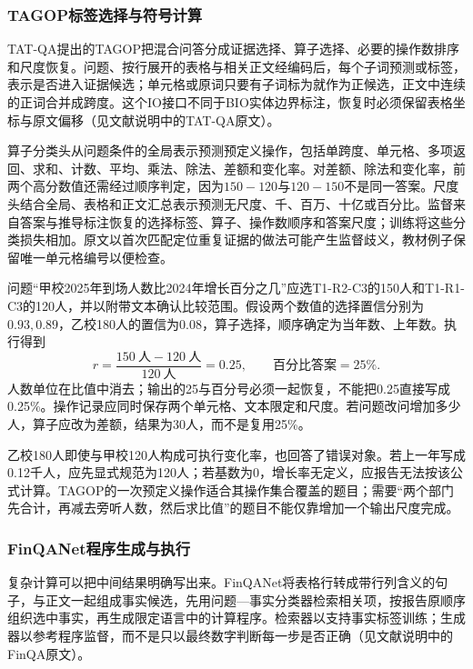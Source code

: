 \subsubsection{TAGOP标签选择与符号计算}
\label{sec:nlp-dialogue-tagop}

TAT-QA提出的TAGOP把混合问答分成证据选择、算子选择、必要的操作数排序和尺度恢复。问题、按行展开的表格与相关正文经编码后，每个子词预测或标签，表示是否进入证据候选；单元格或原词只要有子词标为就作为正候选，正文中连续的正词合并成跨度。这个IO接口不同于BIO实体边界标注，恢复时必须保留表格坐标与原文偏移（见文献说明中的TAT-QA原文）。

算子分类头从问题条件的全局表示预测预定义操作，包括单跨度、单元格、多项返回、求和、计数、平均、乘法、除法、差额和变化率。对差额、除法和变化率，前两个高分数值还需经过顺序判定，因为$150-120$与$120-150$不是同一答案。尺度头结合全局、表格和正文汇总表示预测无尺度、千、百万、十亿或百分比。监督来自答案与推导标注恢复的选择标签、算子、操作数顺序和答案尺度；训练将这些分类损失相加。原文以首次匹配定位重复证据的做法可能产生监督歧义，教材例子保留唯一单元格编号以便检查。

问题“甲校2025年到场人数比2024年增长百分之几”应选T1-R2-C3的150人和T1-R1-C3的120人，并以附带文本确认比较范围。假设两个数值的选择置信分别为$0.93,0.89$，乙校180人的置信为$0.08$，算子选择，顺序确定为当年数、上年数。执行得到
\begin{equation}
 r=\frac{150\ \text{人}-120\ \text{人}}{120\ \text{人}}
   =0.25,\qquad \text{百分比答案}=25\%.
 \label{eq:nlp-dialogue-growth}
\end{equation}
人数单位在比值中消去；输出的25与百分号必须一起恢复，不能把0.25直接写成0.25\%。操作记录应同时保存两个单元格、文本限定和尺度。若问题改问增加多少人，算子应改为差额，结果为30人，而不是复用25\%。

乙校180人即使与甲校120人构成可执行变化率，也回答了错误对象。若上一年写成0.12千人，应先显式规范为120人；若基数为0，增长率无定义，应报告无法按该公式计算。TAGOP的一次预定义操作适合其操作集合覆盖的题目；需要“两个部门先合计，再减去旁听人数，然后求比值”的题目不能仅靠增加一个输出尺度完成。

\subsubsection{FinQANet程序生成与执行}
\label{sec:nlp-dialogue-finqa}

复杂计算可以把中间结果明确写出来。FinQANet将表格行转成带行列含义的句子，与正文一起组成事实候选，先用问题—事实分类器检索相关项，按报告原顺序组织选中事实，再生成限定语言中的计算程序。检索器以支持事实标签训练；生成器以参考程序监督，而不是只以最终数字判断每一步是否正确（见文献说明中的FinQA原文）。

